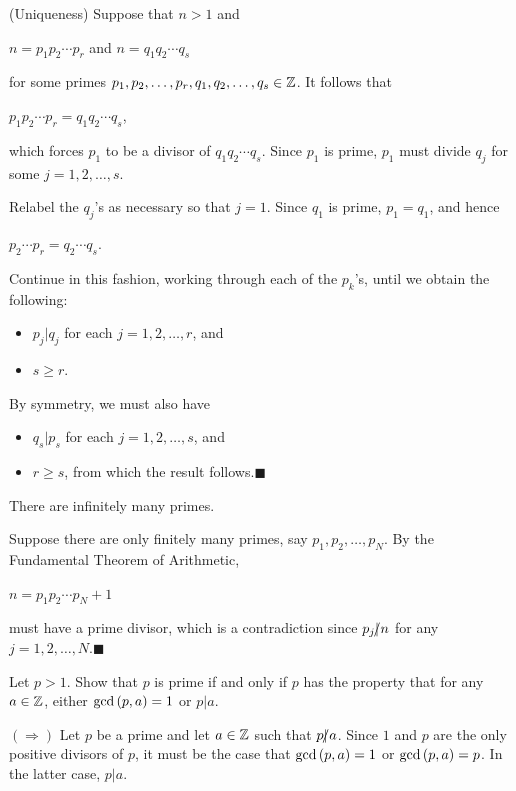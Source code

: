 \documentclass[11pt,fleqn,dvipsnames,usenames]{article}
\newcommand{\p}{\noindent}
\newcommand{\ENDPRF}{\hfill $\blacksquare$}
\begin{document}
\p (Uniqueness) Suppose that $n > 1$ and 
\begin{center}
$n = p_{1}p_{2}\cdots p_{r}$ and $n = q_{1}q_{2}\cdots q_{s}$
\end{center}
for some primes $p_{1},p_{2},\ldots,p_{r},q_{1},q_{2},\ldots, q_{s}\in \mathbb{Z}$.  It follows that
\begin{center}
$p_{1}p_{2}\cdots p_{r} = q_{1}q_{2}\cdots q_{s}$,
\end{center}
which forces $p_{1}$ to be a divisor of $q_{1}q_{2}\cdots q_{s}$.  Since $p_{1}$ is prime, $p_{1}$ must divide $q_{j}$ for some $j=1,2,\ldots, s$.
\vsp

\p Relabel the $q_{j}$'s as necessary so that $j=1$.  Since $q_{1}$ is prime, $p_{1} = q_{1}$, and hence
\begin{center}
$p_{2}\cdots p_{r} = q_{2}\cdots q_{s}$.
\end{center}
Continue in this fashion, working through each of the $p_{k}$'s, until we obtain the following:
\begin{itemize}
\item $p_{j}|q_{j}$ for each $j=1,2,\ldots, r$, and
\item $s\geq r$.
\end{itemize}
By symmetry, we must also have
\begin{itemize}
\item $q_{s}|p_{s}$ for each $j=1,2,\ldots, s$, and 
\item $r\geq s$, from which the result follows.\ENDPRF
\end{itemize}
\vsp

\crlry There are infinitely many primes.
\vsp

\prf Suppose there are only finitely many primes, say $p_{1}, p_{2},\ldots, p_{N}$.  By the Fundamental Theorem of Arithmetic,
\begin{center}
$n = p_{1}p_{2}\cdots p_{N} + 1$
\end{center}
must have a prime divisor, which is a contradiction since $p_{j}|\kern-0.9ex{/} n$ for any $j=1,2,\ldots, N$.\ENDPRF
\vsp

\begin{example}
Let $p > 1$.  Show that $p$ is prime if and only if $p$ has the property that for any $a\in\mathbb{Z}$, either $\text{gcd}\left(p,a\right) = 1$ or $p|a$.
\end{example}

\solution
\vsp

\p $(\Rightarrow)$ Let $p$ be a prime and let $a\in\mathbb{Z}$ such that $p|\kern-0.9ex{/} a$.  Since $1$ and $p$ are the only positive divisors of $p$, it must be the case that $\text{gcd}\left(p,a\right) = 1$ or $\text{gcd}\left(p,a\right) = p$.  In the latter case, $p|a$.
\vsp
\end{document}
